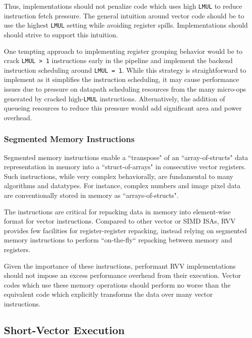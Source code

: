 Thus, implementations should not penalize code which uses high \texttt{LMUL} to reduce instruction fetch pressure.
The general intuition around vector code should be to use the highest \texttt{LMUL} setting while avoiding register spills.
Implementations should should strive to support this intuition.

One tempting approach to implementing register grouping behavior would be to crack \texttt{LMUL > 1} instructions early in the pipeline and implement the backend instruction scheduling around \texttt{LMUL = 1}.
While this strategy is straightforward to implement as it simplifies the instruction scheduling, it may cause performance issues due to pressure on datapath scheduling resources from the many micro-ops generated by cracked high-\texttt{LMUL} instructions.
Alternatively, the addition of queueing resources to reduce this pressure would add significant area and power overhead.


\subsubsection{Segmented Memory Instructions}

Segmented memory instructions enable a ``transpose" of an ``array-of-structs" data representation in memory into a ``struct-of-arrays" in consecutive vector registers.
Such instructions, while very complex behaviorally, are fundamental to many algorithms and datatypes.
For instance, complex numbers and image pixel data are conventionally stored in memory as ``arrays-of-structs".

The instructions are critical for repacking data in memory into element-wise format for vector instructions.
Compared to other vector or SIMD ISAs, RVV provides few facilities for register-register repacking, instead relying on segmented memory instructions to perform ``on-the-fly`` repacking between memory and registers.

Given the importance of these instructions, performant RVV implementations should not impose an excess performance overhead from their execution.
Vector codes which use these memory operations should perform no worse than the equivalent code which explicitly transforms the data over many vector instructions.

\newpage
\subsection{Short-Vector Execution}


